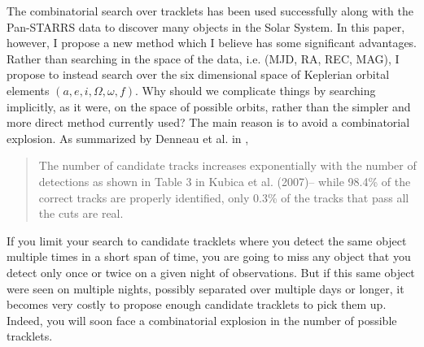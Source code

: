 The combinatorial search over tracklets has been used successfully along with the Pan-STARRS data to discover many objects in the Solar System.
In this paper, however, I propose a new method which I believe has some significant advantages.
Rather than searching in the space of the data, i.e. (MJD, RA, REC, MAG), I propose to instead search over the six dimensional space of 
Keplerian orbital elements $(a, e, i, \Omega, \omega, f)$.
Why should we complicate things by searching implicitly, as it were, on the space of possible orbits,
rather than the simpler and more direct method currently used?
The main reason is to avoid a combinatorial explosion.  As summarized by Denneau et al. in \cite{MOPS},
\begin{quote}
The number of candidate tracks increases exponentially with the number of detections as shown in Table 3 in Kubica et al. (2007)--
while 98.4\% of the correct tracks are properly identified, only 0.3\% of the tracks that pass all the cuts are real.
\end{quote}
If you limit your search to candidate tracklets where you detect the same object multiple times in a short span of time,
you are going to miss any object that you detect only once or twice on a given night of observations.
But if this same object were seen on multiple nights, possibly separated over multiple days or longer, 
it becomes very costly to propose enough candidate tracklets to pick them up.
Indeed, you will soon face a combinatorial explosion in the number of possible tracklets.

